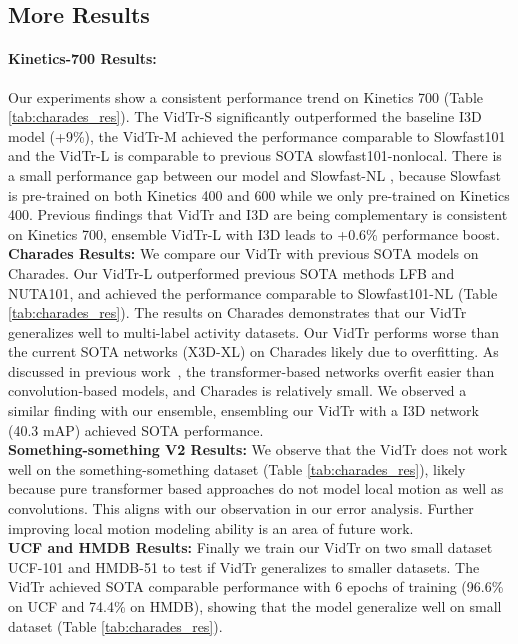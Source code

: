 \documentclass[10pt,twocolumn,letterpaper]{article}
\begin{document}
\subsection{More Results}
\paragraph{Kinetics-700 Results: }
Our experiments show a consistent performance trend on Kinetics 700 (Table \ref{tab:charades_res}). 
The VidTr-S significantly outperformed the baseline I3D model (+9\%), the VidTr-M achieved the performance comparable to Slowfast101  and the VidTr-L is comparable to previous SOTA slowfast101-nonlocal.
There is a small performance gap between our model and Slowfast-NL \cite{feichtenhofer2018slowfast}, because Slowfast is pre-trained on both Kinetics 400 and 600 while we only pre-trained on Kinetics 400. 
Previous findings that VidTr and I3D are being complementary is consistent on Kinetics 700, ensemble VidTr-L with I3D leads to +0.6\% performance boost.\\
\textbf{Charades Results: }
We compare our VidTr with previous SOTA models on Charades. 
Our VidTr-L outperformed previous SOTA methods LFB and NUTA101, and achieved the performance comparable to Slowfast101-NL (Table \ref{tab:charades_res}). The results on Charades demonstrates that our VidTr generalizes well to multi-label activity datasets. 
Our VidTr performs worse than the current SOTA networks (X3D-XL) on Charades likely due to overfitting. 
As discussed in previous work~\cite{dosovitskiy2020image}, the transformer-based networks overfit easier than convolution-based models, and Charades is relatively small. 
We observed a similar finding with our ensemble, ensembling our VidTr with a I3D network (40.3 mAP) achieved SOTA performance.\\
\textbf{Something-something V2 Results: }
We observe that the VidTr does not work well on the something-something dataset (Table \ref{tab:charades_res}), likely because pure transformer based approaches do not model local motion as well as convolutions. This aligns with our observation in our error analysis. 
Further improving  local motion modeling ability is an area of future work.\\
\textbf{UCF and HMDB Results: }
Finally we train our VidTr on two small dataset UCF-101 and HMDB-51 to test if VidTr generalizes to smaller datasets. The VidTr achieved SOTA comparable performance with 6 epochs of training (96.6\% on UCF and 74.4\% on HMDB), showing that the model generalize well on small dataset (Table \ref{tab:charades_res}).
 
\end{document}
